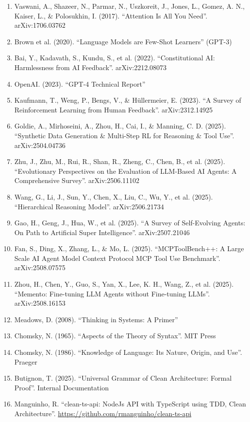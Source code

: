 \documentclass[11pt]{article}
\begin{document}
\begin{enumerate}
    \item Vaswani, A., Shazeer, N., Parmar, N., Uszkoreit, J., Jones, L., Gomez, A. N., Kaiser, L., \& Polosukhin, I. (2017). ``Attention Is All You Need''. arXiv:1706.03762
    \item Brown et al. (2020). ``Language Models are Few-Shot Learners'' (GPT-3)
    \item Bai, Y., Kadavath, S., Kundu, S., et al. (2022). ``Constitutional AI: Harmlessness from AI Feedback''. arXiv:2212.08073
    \item OpenAI. (2023). ``GPT-4 Technical Report''
    \item Kaufmann, T., Weng, P., Bengs, V., \& Hüllermeier, E. (2023). ``A Survey of Reinforcement Learning from Human Feedback''. arXiv:2312.14925
    \item Goldie, A., Mirhoseini, A., Zhou, H., Cai, I., \& Manning, C. D. (2025). ``Synthetic Data Generation \& Multi-Step RL for Reasoning \& Tool Use''. arXiv:2504.04736
    \item Zhu, J., Zhu, M., Rui, R., Shan, R., Zheng, C., Chen, B., et al. (2025). ``Evolutionary Perspectives on the Evaluation of LLM-Based AI Agents: A Comprehensive Survey''. arXiv:2506.11102
    \item Wang, G., Li, J., Sun, Y., Chen, X., Liu, C., Wu, Y., et al. (2025). ``Hierarchical Reasoning Model''. arXiv:2506.21734
    \item Gao, H., Geng, J., Hua, W., et al. (2025). ``A Survey of Self-Evolving Agents: On Path to Artificial Super Intelligence''. arXiv:2507.21046
    \item Fan, S., Ding, X., Zhang, L., \& Mo, L. (2025). ``MCPToolBench++: A Large Scale AI Agent Model Context Protocol MCP Tool Use Benchmark''. arXiv:2508.07575
    \item Zhou, H., Chen, Y., Guo, S., Yan, X., Lee, K. H., Wang, Z., et al. (2025). ``Memento: Fine-tuning LLM Agents without Fine-tuning LLMs''. arXiv:2508.16153
    \item Meadows, D. (2008). ``Thinking in Systems: A Primer''
    \item Chomsky, N. (1965). ``Aspects of the Theory of Syntax''. MIT Press
    \item Chomsky, N. (1986). ``Knowledge of Language: Its Nature, Origin, and Use''. Praeger
    \item Butignon, T. (2025). ``Universal Grammar of Clean Architecture: Formal Proof''. Internal Documentation
    \item Manguinho, R. ``clean-ts-api: NodeJs API with TypeScript using TDD, Clean Architecture''. \url{https://github.com/rmanguinho/clean-ts-api}

\end{enumerate}
\end{document}
